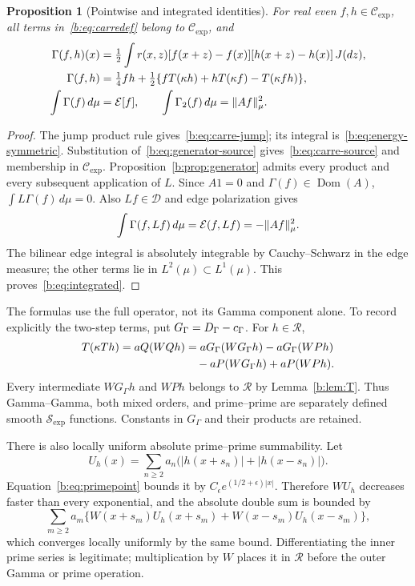 \documentclass[11pt,a4paper]{article}
\numberwithin{equation}{section}
\newtheorem{proposition}[theorem]{Proposition}
\theoremstyle{definition}\newtheorem{definition}[theorem]{Definition}
\theoremstyle{remark}\newtheorem{remark}[theorem]{Remark}
\newcommand{\E}{\mathcal E}\newcommand{\D}{\mathcal D}
\newcommand{\dom}{\operatorname{Dom}}\newcommand{\Var}{\operatorname{Var}}
\newcommand{\RR}{\mathscr R}\newcommand{\SSS}{\mathcal S_{\!\exp}}\newcommand{\CE}{\mathcal C_{\exp}}
\begin{document}
\begin{proposition}[Pointwise and integrated identities]\label{b:prop:carre}
For real even $f,h\in\CE$, all terms in~\eqref{b:eq:carredef} belong to $\CE$, and
\begin{align}
 \Gamma(f,h)(x)&=\tfrac12\int r(x,z)
   [f(x+z)-f(x)][h(x+z)-h(x)]\,J(dz),\label{b:eq:carre-jump}\\
 \Gamma(f,h)&=\tfrac14fh+\tfrac12
   \{fT(\kappa h)+hT(\kappa f)-T(\kappa fh)\},\label{b:eq:carre-source}\\
 \int\Gamma(f)\,d\mu&=\E[f],\qquad
 \int\Gamma_2(f)\,d\mu=\norm{Af}_\mu^2.\label{b:eq:integrated}
\end{align}
\end{proposition}
\begin{proof}
The jump product rule gives~\eqref{b:eq:carre-jump}; its integral is~\eqref{b:eq:energy-symmetric}. Substitution of~\eqref{b:eq:generator-source} gives~\eqref{b:eq:carre-source} and membership in $\CE$. Proposition~\ref{b:prop:generator} admits every product and every subsequent application of $L$. Since $A1=0$ and $\Gamma(f)\in\dom(A)$,
$\int L\Gamma(f)\,d\mu=0$. Also $Lf\in\D$ and edge polarization gives
\[
 \int\Gamma(f,Lf)\,d\mu=\E(f,Lf)=-\norm{Af}_\mu^2.
\]
The bilinear edge integral is absolutely integrable by Cauchy--Schwarz in the edge measure; the other terms lie in $L^2(\mu)\subset L^1(\mu)$. This proves~\eqref{b:eq:integrated}.
\end{proof}

The formulas use the full operator, not its Gamma component alone. To record explicitly the two-step terms, put $G_\Gamma=D_\Gamma-c_\Gamma$. For $h\in\RR$,
\begin{align}\label{b:eq:mixed}
 T(\kappa Th)=aQ(WQh)
 &=aG_\Gamma(WG_\Gamma h)-aG_\Gamma(WPh)\notag\\
 &\quad-aP(WG_\Gamma h)+aP(WPh).
\end{align}
Every intermediate $WG_\Gamma h$ and $WPh$ belongs to $\RR$ by Lemma~\ref{b:lem:T}. Thus Gamma--Gamma, both mixed orders, and prime--prime are separately defined smooth $\SSS$ functions. Constants in $G_\Gamma$ and their products are retained.

There is also locally uniform absolute prime--prime summability. Let
\[
 U_h(x)=\sum_{n\ge2}a_n\bigl(|h(x+s_n)|+|h(x-s_n)|\bigr).
\]
Equation~\eqref{b:eq:primepoint} bounds it by $C_\epsilon e^{(1/2+\epsilon)|x|}$. Therefore $WU_h$ decreases faster than every exponential, and the absolute double sum is bounded by
\[
 \sum_{m\ge2}a_m\{W(x+s_m)U_h(x+s_m)+W(x-s_m)U_h(x-s_m)\},
\]
which converges locally uniformly by the same bound. Differentiating the inner prime series is legitimate; multiplication by $W$ places it in $\RR$ before the outer Gamma or prime operation.
\end{document}
